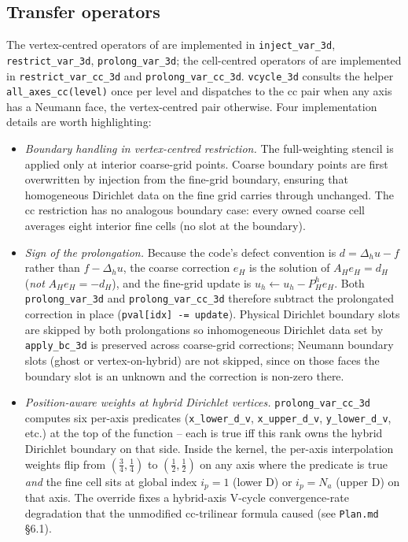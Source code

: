 \documentclass[11pt]{article}
\theoremstyle{definition}
\begin{document}
\subsection{Transfer operators}\label{sec:prolongation}
The vertex-centred operators of  are implemented
in \texttt{inject\_var\_3d}, \texttt{restrict\_var\_3d},
\texttt{prolong\_var\_3d}; the cell-centred operators of
 are implemented in \texttt{restrict\_var\_cc\_3d}
and \texttt{prolong\_var\_cc\_3d}.  \texttt{vcycle\_3d} consults the
helper \texttt{all\_axes\_cc(level)} once per level and dispatches to
the cc pair when any axis has a Neumann face, the vertex-centred
pair otherwise.  Four implementation details are worth highlighting:
\begin{itemize}[leftmargin=*]
  \item \emph{Boundary handling in vertex-centred restriction.}
    The full-weighting stencil is applied only at interior coarse-grid
    points.  Coarse boundary points are first overwritten by injection
    from the fine-grid boundary, ensuring that homogeneous Dirichlet
    data on the fine grid carries through unchanged.  The cc
    restriction has no analogous boundary case: every owned coarse
    cell averages eight interior fine cells (no slot at the boundary).

  \item \emph{Sign of the prolongation.}  Because the code's defect
    convention is $d=\Delta_h u - f$ rather than $f - \Delta_h u$, the
    coarse correction $e_H$ is the solution of $A_H e_H = d_H$
    (\emph{not} $A_H e_H = -d_H$), and the fine-grid update is
    $u_h \leftarrow u_h - P_H^h e_H$.  Both \texttt{prolong\_var\_3d}
    and \texttt{prolong\_var\_cc\_3d} therefore subtract the
    prolongated correction in place
    (\verb|pval[idx] -= update|).  Physical Dirichlet boundary slots
    are skipped by both prolongations so inhomogeneous Dirichlet data
    set by \texttt{apply\_bc\_3d} is preserved across coarse-grid
    corrections; Neumann boundary slots (ghost or vertex-on-hybrid)
    are not skipped, since on those faces the boundary slot is an
    unknown and the correction is non-zero there.

  \item \emph{Position-aware weights at hybrid Dirichlet vertices.}
    \texttt{prolong\_var\_cc\_3d} computes six per-axis predicates
    (\texttt{x\_lower\_d\_v}, \texttt{x\_upper\_d\_v},
    \texttt{y\_lower\_d\_v}, etc.) at the top of the function -- each
    is true iff this rank owns the hybrid Dirichlet boundary on that
    side.  Inside the kernel, the per-axis interpolation weights flip
    from $(\tfrac{3}{4}, \tfrac{1}{4})$ to $(\tfrac{1}{2}, \tfrac{1}{2})$
    on any axis where the predicate is true \emph{and} the fine cell
    sits at global index $i_p = 1$ (lower D) or $i_p = N_a$ (upper D)
    on that axis.  The override fixes a hybrid-axis V-cycle
    convergence-rate degradation that the unmodified cc-trilinear
    formula caused (see \texttt{Plan.md} \S 6.1).


\end{itemize}
\end{document}
